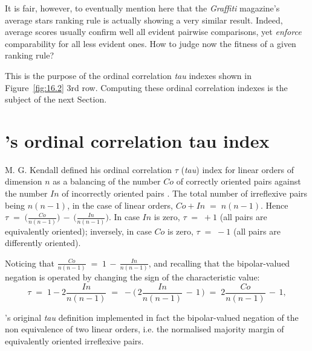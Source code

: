 It is fair, however, to eventually mention here that the \emph{Graffiti} magazine's average stars ranking rule is actually showing a very similar result. Indeed, average scores usually confirm well all evident pairwise comparisons, yet \emph{enforce} comparability for all less evident ones. How to judge now the fitness of a given ranking rule?

This is the purpose of the ordinal correlation \emph{tau} indexes shown in Figure~\vref{fig:16.2} 3rd row. Computing these ordinal correlation indexes is the subject of the next Section.
 
\section{\Kendall 's ordinal correlation tau index}
\label{sec:16:2}

M. G. Kendall defined his ordinal correlation $\tau$ (\emph{tau}) index for linear orders of dimension $n$ as a balancing of the number $Co$ of correctly oriented pairs against the number $In$ of incorrectly oriented pairs \citep{KEN-1938}. The total number of irreflexive pairs being $n(n-1)$, in the case of linear orders, $Co + In \;=\; n(n-1)$.  Hence $\tau \;=\; \big(\frac{Co}{n(n-1)}\big) \,-\, \big(\frac{In}{n(n-1)}\big)$. In case $In$ is zero, $\tau \;=\; +1$  (all pairs are equivalently oriented); inversely, in case $Co$ is zero, $\tau \;=\; -1$ (all pairs are differently oriented).

Noticing that $\frac{Co}{n(n-1)} \;=\; 1 \,-\, \frac{In}{n(n-1)}$, and recalling that the bipolar-valued negation is operated by changing the sign of the characteristic value:
\begin{equation}
      \tau \;=\; 1 -2\frac{In}{n(n-1)} \;=\; -\big(\,2\frac{In}{n(n-1)} \,-\, 1\,\big) \;=\; 2\frac{Co}{n(n-1)} \,-\, 1,
\end{equation} 

\Kendall 's original \emph{tau} definition implemented in fact the bipolar-valued negation of the non equivalence of two linear orders, i.e. the normalised majority margin of equivalently oriented irreflexive pairs.

